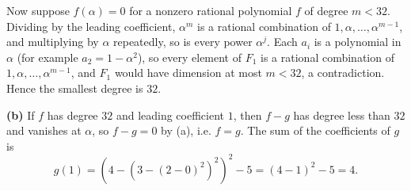 Now suppose $f(\alpha)=0$ for a nonzero rational polynomial $f$ of degree $m<32$. Dividing by the leading coefficient, $\alpha^m$ is a rational combination of $1,\alpha,\dots,\alpha^{m-1}$, and multiplying by $\alpha$ repeatedly, so is every power $\alpha^j$. Each $a_i$ is a polynomial in $\alpha$ (for example $a_2=1-\alpha^2$), so every element of $F_1$ is a rational combination of $1,\alpha,\dots,\alpha^{m-1}$, and $F_1$ would have dimension at most $m<32$, a contradiction. Hence the smallest degree is $\boxed{32}$.

\textbf{(b)} If $f$ has degree $32$ and leading coefficient $1$, then $f-g$ has degree less than $32$ and vanishes at $\alpha$, so $f-g=0$ by (a), i.e. $f=g$. The sum of the coefficients of $g$ is
\[g(1)=\left(4-\left(3-(2-0)^2\right)^2\right)^2-5=(4-1)^2-5=\boxed{4}.\]
